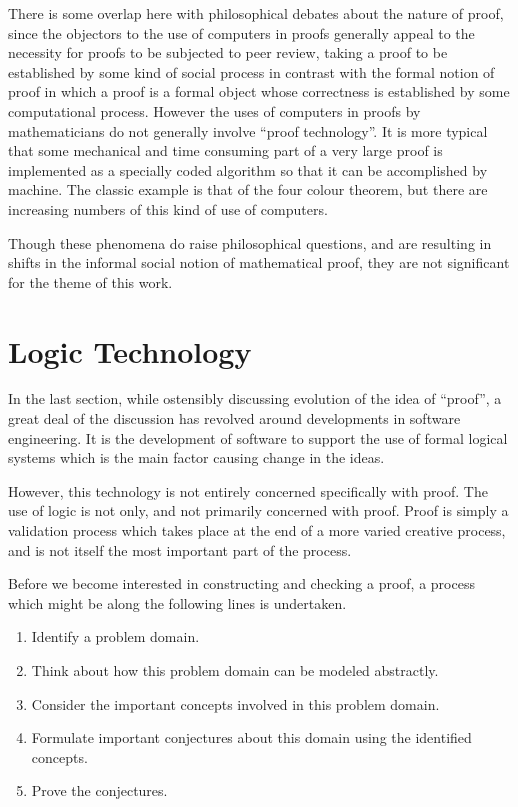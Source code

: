 There is some overlap here with philosophical debates about the nature of proof, since the objectors to the use of computers in proofs generally appeal to the necessity for proofs to be subjected to peer review, taking a proof to be established by some kind of social process in contrast with the formal notion of proof in which a proof is a formal object whose correctness is established by some computational process.
However the uses of computers in proofs by mathematicians do not generally involve ``proof technology''.
It is more typical that some mechanical and time consuming part of a very large proof is implemented as a specially coded algorithm so that it can be accomplished by machine.
The classic example is that of the four colour theorem, but there are increasing numbers of this kind of use of computers.

Though these phenomena do raise philosophical questions, and are resulting in shifts in the informal social notion of mathematical proof, they are not significant for the theme of this work.


\section{Logic Technology}

In the last section, while ostensibly discussing evolution of the idea of ``proof'', a great deal of the discussion has revolved around developments in software engineering.
It is the development of software to support the use of formal logical systems which is the main factor causing change in the ideas.

However, this technology is not entirely concerned specifically with proof.
The use of logic is not only, and not primarily concerned with proof.
Proof is simply a validation process which takes place at the end of a more varied creative process, and is not itself the most important part of the process.

Before we become interested in constructing and checking a proof, a process which might be along the following lines is undertaken.

\begin{enumerate}
\item Identify a problem domain.
\item Think about how this problem domain can be modeled abstractly.
\item Consider the important concepts involved in this problem domain.
\item Formulate important conjectures about this domain using the identified concepts.
\item Prove the conjectures.
\end{enumerate}

